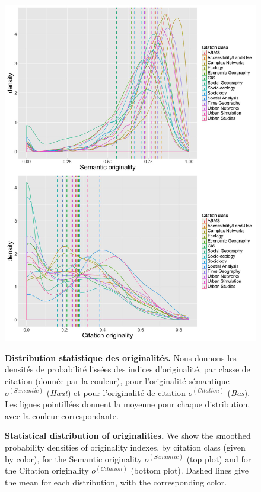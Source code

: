 \begin{figure}
\includegraphics[width=\linewidth]{Figures/Final/B-cybergeo-fig10.jpg}
\caption{\textbf{Statistical distribution of originalities.} We show the smoothed probability densities of originality indexes, by citation class (given by color), for the Semantic originality $o^{(Semantic)}$ (top plot) and for the Citation originality $o^{(Citation)}$ (bottom plot). Dashed lines give the mean for each distribution, with the corresponding color.\label{fig:cybergeo:fig10}}{\textbf{Distribution statistique des originalités.} Nous donnons les densités de probabilité lissées des indices d'originalité, par classe de citation (donnée par la couleur), pour l'originalité sémantique $o^{(Semantic)}$ (\textit{Haut}) et pour l'originalité de citation $o^{(Citation)}$ (\textit{Bas}). Les lignes pointillées donnent la moyenne pour chaque distribution, avec la couleur correspondante.\label{fig:cybergeo:fig10}}
\end{figure}


